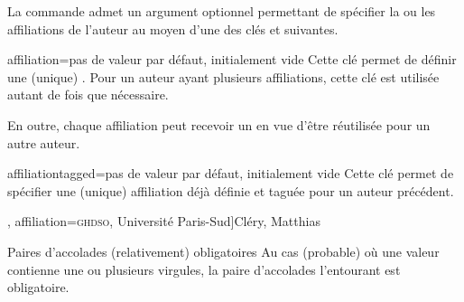 \documentclass[french,nolocaltoc]{nwejmart}
\newtheorem[title=Fait,style=definition]{fact}
\begin{document}
La commande  admet un argument optionnel permettant de spécifier
la ou les affiliations de l'auteur au moyen d'une des clés 
et  suivantes.

\begin{docKey}{affiliation}{={}}{pas de valeur par défaut,
    initialement vide}
  Cette clé permet de définir une (unique) . Pour un auteur
  ayant plusieurs affiliations, cette clé est utilisée autant de fois que
  nécessaire.

  En outre, chaque affiliation peut recevoir un  en vue d'être
  réutilisée pour un autre auteur.
\end{docKey}

\begin{docKey}{affiliationtagged}{={}}{pas de valeur par défaut,
    initialement vide}
  Cette clé permet de spécifier une (unique) affiliation déjà définie et taguée
  pour un auteur précédent.
\end{docKey}


\begin{bodycode}[listing options={deletekeywords={author}}]
\author[
  affiliation={Laboratoire \textsc{sphere}, Université Paris Diderot}
  ]{Bustamante, Martha-Cecilia}
\author[
  affiliation=[aff2]{\textsc{lpma}, Université Pierre et Marie Curie},
  affiliation={\textsc{ghdso}, Université Paris-Sud}]{Cléry, Matthias}
\author[
  affiliationtagged={aff2}
]{Mazliak, Laurent}
\end{bodycode}

\begin{dbwarning}{Paires d'accolades
    (relativement) obligatoires}{}
  Au cas (probable) où une valeur  contienne une ou plusieurs
  virgules, la paire d'accolades l'entourant est obligatoire.
\end{dbwarning}
\end{document}
